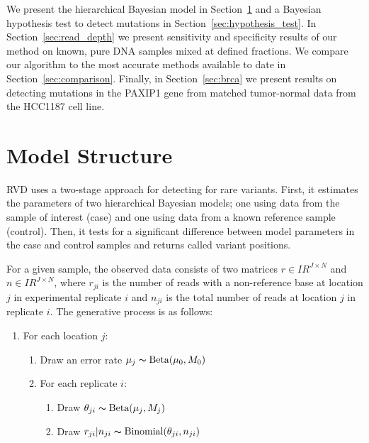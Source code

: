 \documentclass[11pt,reqno]{amsart}
\newcommand{\RR}{I\!\!R} %
\begin{document}
We present the hierarchical Bayesian model in Section~\ref{sec:model_structure} and a Bayesian hypothesis test to detect mutations in Section~\ref{sec:hypothesis_test}. In Section~\ref{sec:read_depth} we present sensitivity and specificity results of our method on known, pure DNA samples mixed at defined fractions. We compare our algorithm to the most accurate methods available to date in Section~\ref{sec:comparison}. Finally, in Section~\ref{sec:brca} we present results on detecting mutations in the PAXIP1 gene from matched tumor-normal data from the HCC1187 cell line.

\section{Model Structure}\label{sec:model_structure}


RVD uses a two-stage approach for detecting for rare variants. First, it estimates the parameters of two hierarchical Bayesian models; one using data from the sample of interest (case) and one using data from a known reference sample (control). Then, it tests for a significant difference between model parameters in the case and control samples and returns called variant positions.

For a given sample, the observed data consists of two matrices $r \in \RR^{J \times N}$ and $n \in \RR^{J \times N}$, where $r_{ji}$ is the number of reads with a non-reference base at location $j$ in experimental replicate $i$ and $n_{ji}$ is the total number of reads at location $j$ in replicate $i$. The generative process is as follows:

\begin{enumerate}[noitemsep]
	\item For each location $j$: 
	\begin{enumerate}
		\item Draw an error rate $\mu_j \thicksim \text{Beta}(\mu_0, M_0)$
		\item For each replicate $i$:
		\begin{enumerate}
			\item Draw $\theta_{ji} \thicksim \text{Beta}(\mu_j, M_j)$
			\item Draw $r_{ji} | n_{ji} \thicksim \text{Binomial}(\theta_{ji}, n_{ji})$
		\end{enumerate}
	\end{enumerate}
\end{enumerate}
\end{document}
